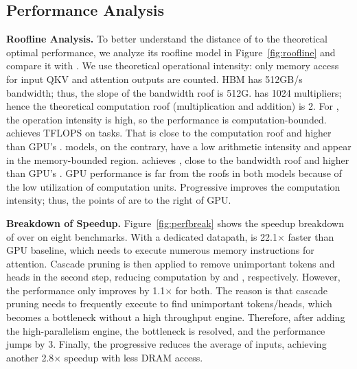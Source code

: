 \subsection{Performance Analysis}
\textbf{Roofline Analysis.}
To better understand the distance of \spattenfull\xspace to the theoretical optimal performance, we analyze its roofline model in Figure~\ref{fig:roofline} and compare it with \titanxp. We use theoretical operational intensity: only memory access for input QKV and attention outputs are counted. HBM has 512GB/s bandwidth; thus, the slope of the bandwidth roof is 512G. \spattenfull\xspace has 1024 multipliers; hence the theoretical computation roof (multiplication and addition) is 2\tflopss. For \bert, the operation intensity is high, so the performance is computation-bounded. \spattenfull\xspace achieves \spattenbertflops TFLOPS on \bert tasks. That is close to the computation roof and higher than GPU's \gpubertflops\tflopss. \gpttwo models, on the contrary, have a low arithmetic intensity and appear in the memory-bounded region. \spattenfull\xspace achieves \spattengpttwoflops\tflopss, close to the bandwidth roof and higher than GPU's \gpugpttwoflops\tflopss. GPU performance is far from the roofs in both models because of the low utilization of computation units. Progressive \lowprec improves the computation intensity; thus, the points of \spattenfull\xspace are to the right of GPU.



\textbf{Breakdown of Speedup.}
Figure~\ref{fig:perfbreak} shows the speedup breakdown of \spattenfull\xspace over \titanxp \xspace on eight \gpttwo benchmarks. With a dedicated datapath, \spattenfull\xspace is 22.1$\times$ faster than GPU baseline, which needs to execute numerous memory instructions for attention. Cascade pruning is then applied to remove unimportant tokens and heads in the second step, reducing computation by \prunegpttwodramsaving\x and \hpdramsaving\x, respectively. However, the performance only improves by 1.1$\times$ for both. The reason is that cascade pruning needs to frequently execute \topk to find unimportant tokens/heads, which becomes a bottleneck without a high throughput \topk engine. Therefore, after adding the high-parallelism \topk engine, the bottleneck is resolved, and the performance jumps by 3\x. Finally, the progressive \lowprec reduces the average \bitwidth of inputs, achieving another 2.8$\times$ speedup with less DRAM access.


